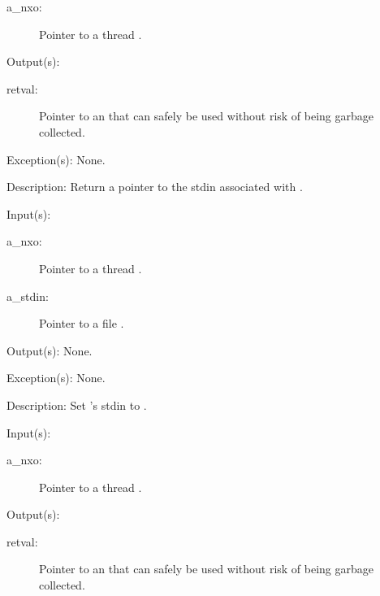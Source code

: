 \begin{capi}
\begin{capilist}
\begin{description}
		\item[a\_nxo: ]
			Pointer to a thread .
		\end{description}
	\item[Output(s): ]
		\begin{description}\item[]
		\item[retval: ]
			Pointer to an  that can safely be used
			without risk of being garbage collected.
		\end{description}
	\item[Exception(s): ] None.
	\item[Description: ]
		Return a pointer to the stdin associated with .
	\end{capilist}
\label{nxo_thread_stdin_set}
	\begin{capilist}
	\item[Input(s): ]
		\begin{description}\item[]
		\item[a\_nxo: ]
			Pointer to a thread .
		\item[a\_stdin: ]
			Pointer to a file .
		\end{description}
	\item[Output(s): ] None.
	\item[Exception(s): ] None.
	\item[Description: ]
		Set 's stdin to .
	\end{capilist}
\label{nxo_thread_stdout_get}
	\begin{capilist}
	\item[Input(s): ]
		\begin{description}\item[]
		\item[a\_nxo: ]
			Pointer to a thread \classname{nxo}.
		\end{description}
	\item[Output(s): ]
		\begin{description}\item[]
		\item[retval: ]
			Pointer to an  that can safely be used
			without risk of being garbage collected.

\end{description}
\end{capilist}
\end{capi}
